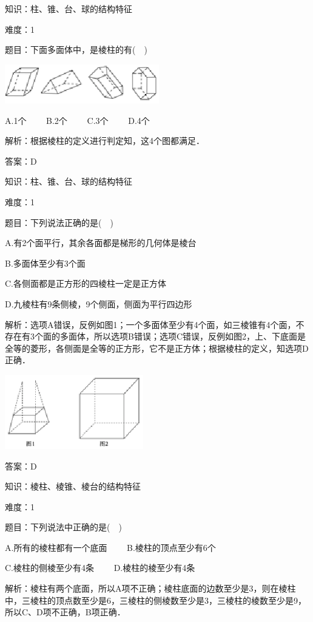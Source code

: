 \documentclass{article} %
\begin{document}


知识：柱、锥、台、球的结构特征

难度：1

题目：下面多面体中，是棱柱的有(　)

\includegraphics*[width=2.65in, height=0.67in, keepaspectratio=false]{image3}

A.1个　　 B.2个　　 C.3个　　 D.4个

解析：根据棱柱的定义进行判定知，这4个图都满足．

答案：D

知识：柱、锥、台、球的结构特征

难度：1

题目：下列说法正确的是(　)

A.有2个面平行，其余各面都是梯形的几何体是棱台

B.多面体至少有3个面

C.各侧面都是正方形的四棱柱一定是正方体

D.九棱柱有9条侧棱，9个侧面，侧面为平行四边形

解析：选项A错误，反例如图1；一个多面体至少有4个面，如三棱锥有4个面，不存在有3个面的多面体，所以选项B错误；选项C错误，反例如图2，上、下底面是全等的菱形，各侧面是全等的正方形，它不是正方体；根据棱柱的定义，知选项D正确．

\includegraphics*[width=2.37in, height=1.27in, keepaspectratio=false]{image4}

答案：D

知识：棱柱、棱锥、棱台的结构特征

难度：1

题目：下列说法中正确的是(　)

A.所有的棱柱都有一个底面　　 B.棱柱的顶点至少有6个

C.棱柱的侧棱至少有4条　　 D.棱柱的棱至少有4条

解析：棱柱有两个底面，所以A项不正确；棱柱底面的边数至少是3，则在棱柱中，三棱柱的顶点数至少是6，三棱柱的侧棱数至少是3，三棱柱的棱数至少是9，所以C、D项不正确，B项正确．
\end{document}
